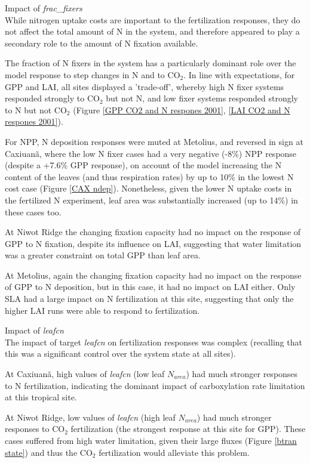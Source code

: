 \documentclass[draft,linenumbers]{agujournal}
\begin{document}
Impact of \emph{frac\_fixers}\\
While nitrogen uptake costs are important to the fertilization responses, they do not affect the total amount of N in the system, and therefore appeared to play a secondary role to the amount of N fixation available.

The fraction of N fixers in the system has a particularly dominant role over the model response to step changes in N and to CO$_{2}$. In line with expectations, for GPP and LAI, all sites displayed a 'trade-off', whereby high N fixer systems responded strongly to CO$_{2}$ but not N, and low fixer systems responded strongly to N but not CO$_{2}$ (Figure \ref{GPP CO2 and N respones 2001}, \ref{LAI CO2 and N respones 2001}). 

For NPP, N deposition responses were muted at Metolius, and reversed in sign at Caxiuan\~a, where the low N fixer cases had a very negative (-8\%) NPP response (despite a +7.6\% GPP response), on account of the model increasing the N content of the leaves (and thus respiration rates) by up to 10\% in the lowest N cost case (Figure \ref{CAX ndep}). Nonetheless, given the lower N uptake costs in the fertilized N experiment, leaf area was substantially increased (up to 14\%) in these cases too. 

At Niwot Ridge the changing fixation capacity had no impact on the response of GPP to N fixation, despite its influence on LAI, suggesting that water limitation was a greater constraint on total GPP than leaf area. 

At Metolius, again the changing fixation capacity had no impact on the response of GPP to N deposition, but in this case, it had no impact on LAI either. Only SLA had a large impact on N fertilization at this site, suggesting that only the higher LAI runs were able to respond to fertilization.  

Impact of \emph{leafcn}\\
The impact of target \emph{leafcn} on fertilization responses was complex (recalling that this was a significant control over the system state at all sites).

At Caxiuan\~a, high values of \emph{leafcn} (low leaf $N_{area}$) had much stronger responses to N fertilization, indicating the dominant impact of carboxylation rate limitation at this tropical site. 

At Niwot Ridge, low values of \emph{leafcn} (high leaf $N_{area}$) had much stronger responses to CO$_{2}$ fertilization (the strongest response at this site for GPP). These cases suffered from high water limitation, given their large fluxes (Figure \ref{btran state}) and thus the CO$_{2}$ fertilization would alleviate this problem. 
\end{document}
